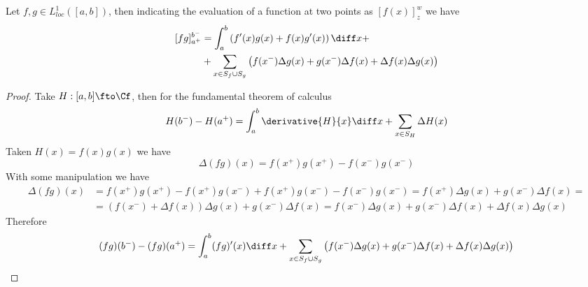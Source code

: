 \documentclass[../mmf.tex]{subfiles}
\begin{document}
\begin{thm}
	Let $f,g\in L^1_{loc}([a,b])$, then indicating the evaluation of a function at two points as $[f(x)]_z^w$ we have
	\begin{equation}
		\begin{aligned}
			[fg]_{a^+}^{b^-}&=\int_{a}^{b}\left( f'(x)g(x)+f(x)g'(x) \right)\diff x+\\
			&+\sum_{x\in S_{f}\cup S_{g}}\left( f(x^-)\Delta g(x)+ g(x^-)\Delta f(x)+\Delta f(x)\Delta g(x) \right)
		\end{aligned}
		\label{eq:localpartint}
	\end{equation}
\end{thm}
\begin{proof}
	Take $H:[a,b]\fto\Cf$, then for the fundamental theorem of calculus
	\begin{equation*}
		H(b^-)-H(a^+)=\int_{a}^{b}\derivative{H}{x}\diff x+\sum_{x\in S_H}\Delta H(x)
	\end{equation*}
	Taken $H(x)=f(x)g(x)$ we have
	\begin{equation*}
		\Delta(fg)(x)=f(x^+)g(x^+)-f(x^-)g(x^-)
	\end{equation*}
	With some manipulation we have
	\begin{equation*}
		\begin{aligned}
			\Delta(fg)(x)&=f(x^+)g(x^+)-f(x^+)g(x^-)+f(x^+)g(x^-)-f(x^-)g(x^-)=f(x^+)\Delta g(x)+g(x^-)\Delta f(x)=\\
			&=\left( f(x^-)+\Delta f(x) \right)\Delta g(x)+g(x^-)\Delta f(x)=f(x^-)\Delta g(x)+g(x^-)\Delta f(x)+\Delta f(x)\Delta g(x)
		\end{aligned}
	\end{equation*}
	Therefore
	\begin{equation*}
		(fg)(b^-)-(fg)(a^+)=\int_{a}^{b}(fg)'(x)\diff x+\sum_{x\in S_f\cup S_g}\left( f(x^-)\Delta g(x)+g(x^-)\Delta f(x)+\Delta f(x)\Delta g(x) \right)
	\end{equation*}
\end{proof}
\end{document}
